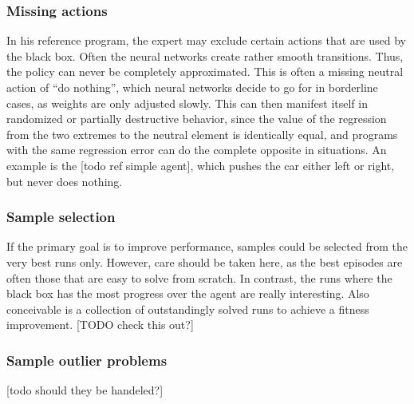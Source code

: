\subsubsection{Missing actions} 
In his reference program, the expert may exclude certain actions that are used by the black box. Often the neural networks create rather smooth transitions. Thus, the policy can never be completely approximated.
This is often a missing neutral action of ``do nothing'', which neural networks decide to go for in borderline cases, as weights are only adjusted slowly. This can then manifest itself in randomized or partially destructive behavior, since the value of the regression from the two extremes to the neutral element is identically equal, and programs with the same regression error can do the complete opposite in situations.
An example is the [todo ref simple agent], which pushes the car either left or right, but never does nothing. 

\subsubsection{Sample selection}
If the primary goal is to improve performance, samples could be selected from the very best runs only. However, care should be taken here, as the best episodes are often those that are easy to solve from scratch. In contrast, the runs where the black box has the most progress over the agent are really interesting. Also conceivable is a collection of outstandingly solved runs to achieve a fitness improvement. [TODO check this out?]

\subsubsection{Sample outlier problems}
[todo should they be handeled?]

